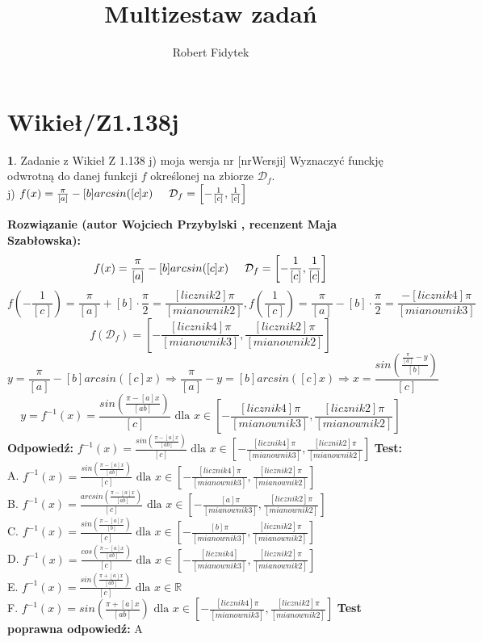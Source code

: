 \documentclass[12pt, a4paper]{article}
\title{Multizestaw zadań}
\author{Robert Fidytek}
\date{}
\theoremstyle{definition} %
\newtheorem{zad}{}
\newcommand{\kategoria}[1]{\section{#1}} %
\newcommand{\zadStart}[1]{\begin{zad}#1\newline} %
\newcommand{\zadStop}{\end{zad}}   %
\newcommand{\rozwStart}[2]{\noindent \textbf{Rozwiązanie (autor #1 , recenzent #2): }\newline} %
\newcommand{\rozwStop}{\newline}                                            %
\newcommand{\odpStart}{\noindent \textbf{Odpowiedź:}\newline}    %
\newcommand{\odpStop}{\newline}                                             %
\newcommand{\testStart}{\noindent \textbf{Test:}\newline} %
\newcommand{\testStop}{\newline} %
\newcommand{\kluczStart}{\noindent \textbf{Test poprawna odpowiedź:}\newline} %
\newcommand{\kluczStop}{\newline} %
\begin{document}
\maketitle


\kategoria{Wikieł/Z1.138j}
\zadStart{Zadanie z Wikieł Z 1.138 j) moja wersja nr [nrWersji]}
Wyznaczyć funckję odwrotną do danej funkcji $f$ określonej na zbiorze $\mathcal{D}_{f}$.\\
j) $f(x)=\frac{\pi}{[a]}-[b]arcsin([c]x)\hspace{5mm}\mathcal{D}_{f}=\left[-\frac{1}{[c]},\frac{1}{[c]}\right]$
\zadStop
\rozwStart{Wojciech Przybylski}{Maja Szabłowska}
$$f(x)=\frac{\pi}{[a]}-[b]arcsin([c]x)\hspace{5mm} \mathcal{D}_{f}=\left[-\frac{1}{[c]},\frac{1}{[c]}\right]$$
$$f(-\frac{1}{[c]})=\frac{\pi}{[a]}+[b]\cdot\frac{\pi}{2}=\frac{[licznik2]\pi}{[mianownik2]}, f(\frac{1}{[c]})=\frac{\pi}{[a]}-[b]\cdot\frac{\pi}{2}=\frac{-[licznik4]\pi}{[mianownik3]}$$
$$f(\mathcal{D}_{f})=\left[-\frac{[licznik4]\pi}{[mianownik3]},\frac{[licznik2]\pi}{[mianownik2]}\right]$$
$$y=\frac{\pi}{[a]}-[b]arcsin([c]x)\Rightarrow \frac{\pi}{[a]}-y=[b]arcsin([c]x) \Rightarrow x=\frac{sin\left(\frac{\frac{\pi}{[a]}-y}{[b]}\right)}{[c]}$$
$$y=f^{-1}(x)=\frac{sin\left(\frac{\pi-[a]x}{[ab]}\right)}{[c]} \mbox{ dla } x\in \left[-\frac{[licznik4]\pi}{[mianownik3]},\frac{[licznik2]\pi}{[mianownik2]}\right]$$
\rozwStop
\odpStart
$f^{-1}(x)=\frac{sin\left(\frac{\pi-[a]x}{[ab]}\right)}{[c]} \mbox{ dla } x\in \left[-\frac{[licznik4]\pi}{[mianownik3]},\frac{[licznik2]\pi}{[mianownik2]}\right]$
\odpStop
\testStart
A. $f^{-1}(x)=\frac{sin\left(\frac{\pi-[a]x}{[ab]}\right)}{[c]} \mbox{ dla } x\in \left[-\frac{[licznik4]\pi}{[mianownik3]},\frac{[licznik2]\pi}{[mianownik2]}\right]$\\
B. $f^{-1}(x)=\frac{arcsin\left(\frac{\pi-[a]x}{[ab]}\right)}{[c]} \mbox{ dla } x\in \left[-\frac{[a]\pi}{[mianownik3]},\frac{[licznik2]\pi}{[mianownik2]}\right]$\\
C. $f^{-1}(x)=\frac{sin\left(\frac{\pi-[a]x}{[b]}\right)}{[c]} \mbox{ dla } x\in \left[-\frac{[b]\pi}{[mianownik3]},\frac{[licznik2]\pi}{[mianownik2]}\right]$\\
D. $f^{-1}(x)=\frac{cos\left(\frac{\pi-[a]x}{[ab]}\right)}{[c]} \mbox{ dla } x\in \left[-\frac{[licznik4]}{[mianownik3]},\frac{[licznik2]\pi}{[mianownik2]}\right]$\\
E. $f^{-1}(x)=\frac{sin\left(\frac{\pi+[a]x}{[ab]}\right)}{[c]} \mbox{ dla } x\in \mathbb{R}$\\
F. $f^{-1}(x)=sin\left(\frac{\pi+[a]x}{[ab]}\right) \mbox{ dla } x\in \left[-\frac{[licznik4]\pi}{[mianownik3]},\frac{[licznik2]\pi}{[mianownik2]}\right]$
\testStop
\kluczStart
A
\kluczStop
\end{document}
